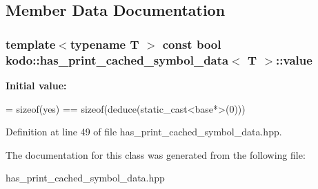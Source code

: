 \subsection{Member Data Documentation}
\hypertarget{classkodo_1_1has__print__cached__symbol__data_ace0805a575a923775191fe0fabffa2ca}{
\subsubsection[{value}]{\setlength{\rightskip}{0pt plus 5cm}template$<$typename T $>$ const bool {\bf kodo\-::has\-\_\-print\-\_\-cached\-\_\-symbol\-\_\-data}$<$ T $>$\-::value\hspace{0.3cm}{\ttfamily [static]}}}\label{classkodo_1_1has__print__cached__symbol__data_ace0805a575a923775191fe0fabffa2ca}
{\bfseries Initial value\-:}
\begin{DoxyCode}
=
            \textcolor{keyword}{sizeof}(yes) == \textcolor{keyword}{sizeof}(deduce(static\_cast<base*>(0)))
\end{DoxyCode}


Definition at line 49 of file has\-\_\-print\-\_\-cached\-\_\-symbol\-\_\-data.\-hpp.



The documentation for this class was generated from the following file\-:\begin{DoxyCompactItemize}
\item 
has\-\_\-print\-\_\-cached\-\_\-symbol\-\_\-data.\-hpp\end{DoxyCompactItemize}

